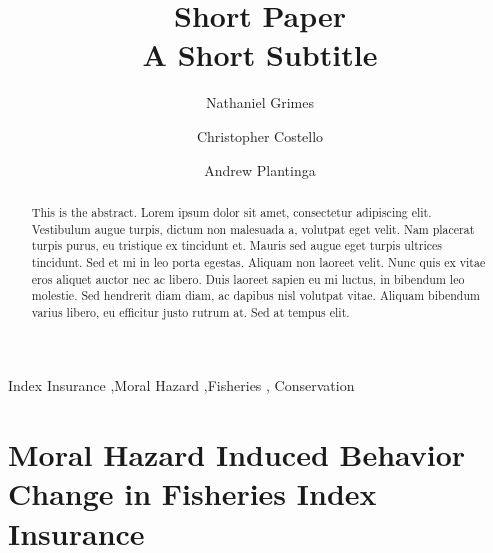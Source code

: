 \documentclass[
  super,
  preprint,
  3p]{elsarticle}
\theoremstyle{plain}
\theoremstyle{plain}
\theoremstyle{remark}
\begin{document}
\begin{frontmatter}
\title{Short Paper \\\large{A Short Subtitle} }
\author[1]{Nathaniel Grimes%
%
}
\author[2]{Christopher Costello%
%
}
\author[2]{Andrew Plantinga%
%
}





        
\begin{abstract}
This is the abstract. Lorem ipsum dolor sit amet, consectetur adipiscing
elit. Vestibulum augue turpis, dictum non malesuada a, volutpat eget
velit. Nam placerat turpis purus, eu tristique ex tincidunt et. Mauris
sed augue eget turpis ultrices tincidunt. Sed et mi in leo porta
egestas. Aliquam non laoreet velit. Nunc quis ex vitae eros aliquet
auctor nec ac libero. Duis laoreet sapien eu mi luctus, in bibendum leo
molestie. Sed hendrerit diam diam, ac dapibus nisl volutpat vitae.
Aliquam bibendum varius libero, eu efficitur justo rutrum at. Sed at
tempus elit.
\end{abstract}





\begin{keyword}
    Index Insurance \sep Moral Hazard \sep Fisheries \sep 
    Conservation
\end{keyword}
\end{frontmatter}
    \ifdefined\Shaded\renewenvironment{Shaded}{\begin{tcolorbox}[breakable, frame hidden, enhanced, interior hidden, sharp corners, borderline west={3pt}{0pt}{shadecolor}, boxrule=0pt]}{\end{tcolorbox}}\fi

\hypertarget{moral-hazard-induced-behavior-change-in-fisheries-index-insurance}{%
\section{Moral Hazard Induced Behavior Change in Fisheries Index
Insurance}\label{moral-hazard-induced-behavior-change-in-fisheries-index-insurance}}
\end{document}
